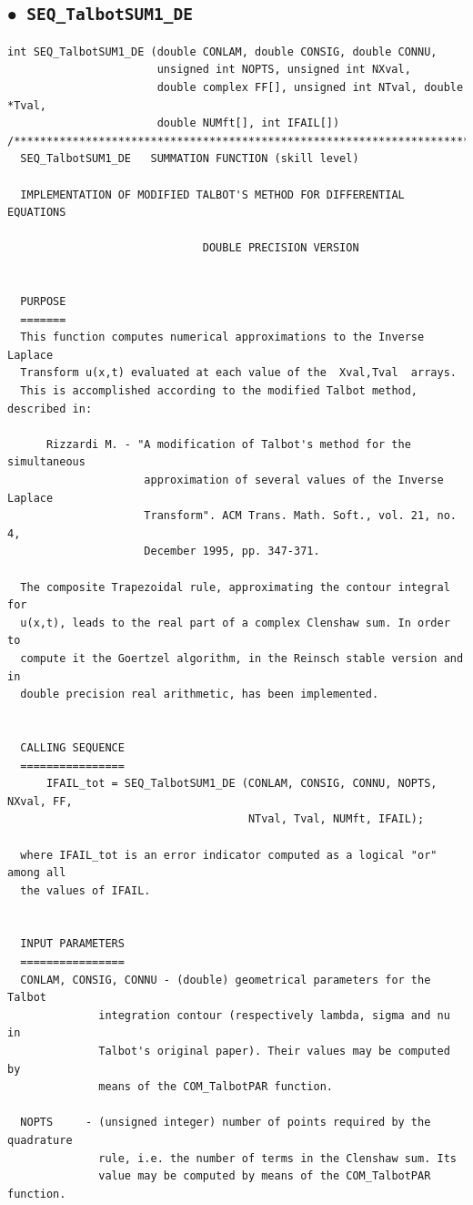 \documentclass[a4paper,10pt]{report}%
\begin{document}
\subsection{\texorpdfstring{$\boldsymbol{\bullet}$}{ - }{\tt\ SEQ\_TalbotSUM1\_DE}}
\begin{lstlisting}
int SEQ_TalbotSUM1_DE (double CONLAM, double CONSIG, double CONNU,
                       unsigned int NOPTS, unsigned int NXval,
                       double complex FF[], unsigned int NTval, double *Tval,
                       double NUMft[], int IFAIL[])
/*****************************************************************************
  SEQ_TalbotSUM1_DE   SUMMATION FUNCTION (skill level)

  IMPLEMENTATION OF MODIFIED TALBOT'S METHOD FOR DIFFERENTIAL EQUATIONS

                              DOUBLE PRECISION VERSION


  PURPOSE
  =======
  This function computes numerical approximations to the Inverse Laplace
  Transform u(x,t) evaluated at each value of the  Xval,Tval  arrays.
  This is accomplished according to the modified Talbot method, described in:

      Rizzardi M. - "A modification of Talbot's method for the simultaneous
                     approximation of several values of the Inverse Laplace
                     Transform". ACM Trans. Math. Soft., vol. 21, no. 4,
                     December 1995, pp. 347-371.

  The composite Trapezoidal rule, approximating the contour integral for
  u(x,t), leads to the real part of a complex Clenshaw sum. In order to
  compute it the Goertzel algorithm, in the Reinsch stable version and in
  double precision real arithmetic, has been implemented.


  CALLING SEQUENCE
  ================
      IFAIL_tot = SEQ_TalbotSUM1_DE (CONLAM, CONSIG, CONNU, NOPTS, NXval, FF,
                                     NTval, Tval, NUMft, IFAIL);

  where IFAIL_tot is an error indicator computed as a logical "or" among all
  the values of IFAIL.


  INPUT PARAMETERS
  ================
  CONLAM, CONSIG, CONNU - (double) geometrical parameters for the Talbot
              integration contour (respectively lambda, sigma and nu in
              Talbot's original paper). Their values may be computed by
              means of the COM_TalbotPAR function.

  NOPTS     - (unsigned integer) number of points required by the quadrature
              rule, i.e. the number of terms in the Clenshaw sum. Its
              value may be computed by means of the COM_TalbotPAR function.


\end{lstlisting}
\end{document}
